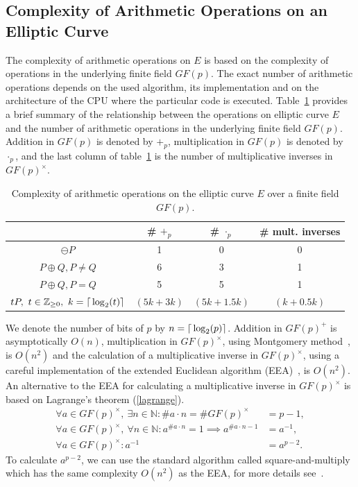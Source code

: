\documentclass[thesis=M,english]{FITthesis}[2012/10/20]
\theoremstyle{remark}
\theoremstyle{definition}
\begin{document}
\subsection{Complexity of Arithmetic Operations on an Elliptic Curve} 
The complexity of arithmetic operations on $E$ is based on the complexity of operations in the underlying finite field $GF(p)$. The exact number of arithmetic operations depends on the used algorithm, its implementation and on the architecture of the CPU where the particular code is executed. Table~\ref{tblComp} provides a brief summary of the relationship between the operations on elliptic curve $E$ and the number of arithmetic operations in the underlying finite field $GF(p)$. Addition in $GF(p)$ is denoted by $+_p$, multiplication in $GF(p)$ is denoted by $\cdot_p$, and the last column of table~\ref{tblComp} is the number of multiplicative inverses in $GF(p)^{\times}$.
\begin{table}[H]
\centering
\begin{tabular}{ |c||c|c|c| } 
 \hline
 & \# $+_p$ & \# $\cdot_p$ & \# mult. inverses \\ 
 \hline
 \hline
$\ominus P$ & 1 & 0 & 0  \\  \hline
$P \oplus Q, P \neq Q$ & 6 & 3 & 1 \\  \hline
$P \oplus Q, P = Q$ & 5 & 5 & 1 \\  \hline
$tP,\ t \in \mathbb{Z}_{\geq 0},\ k = \mathlarger{\lceil} \log_2(t) \mathlarger{\rceil}$\footnotemark & $ (5k + 3k)$ & $(5k + 1.5k)$ & $(k + 0.5k)$ \\ \hline
\end{tabular}
\caption[Complexity of arithmetic operations on $E$]{Complexity of arithmetic operations on the elliptic curve $E$ over a finite field $GF(p)$.}
\label{tblComp}
\end{table}
\noindent We denote the number of bits of $p$ by $n = \mathlarger{\lceil} \log_2(p) \mathlarger{\rceil}$. Addition in $GF(p)^{+}$ is asymptotically $O(n)$, multiplication in $GF(p)^{\times}$, using Montgomery method~\cite{handbook}, is $O(n^2)$ and the calculation of a multiplicative inverse in $GF(p)^{\times}$, using a careful implementation of the extended Euclidean algorithm (EEA)~\cite{handbook}, is $O(n^2)$. An alternative to the EEA for calculating a multiplicative inverse in $GF(p)^{\times}$ is based on Lagrange's theorem (\ref{lagrange}). 
\begin{align*}
\forall a \in GF(p)^{\times},\ \exists n \in \mathbb{N}: \#a \cdot n = \#GF(p)^{\times} &= p - 1, \\ 
\forall a \in GF(p)^{\times},\ \forall n \in \mathbb{N}: a^{\#a \cdot n} = 1 \implies a^{\#a \cdot n - 1} &= a^{-1}, \\
\forall a \in GF(p)^{\times}: a^{-1} &= a^{p-2}.
\end{align*}
To calculate $a^{p-2}$, we can use the standard algorithm called square-and-multiply which has the same complexity $O(n^2)$ as the EEA, for more details see~\cite{mky}.
\end{document}
